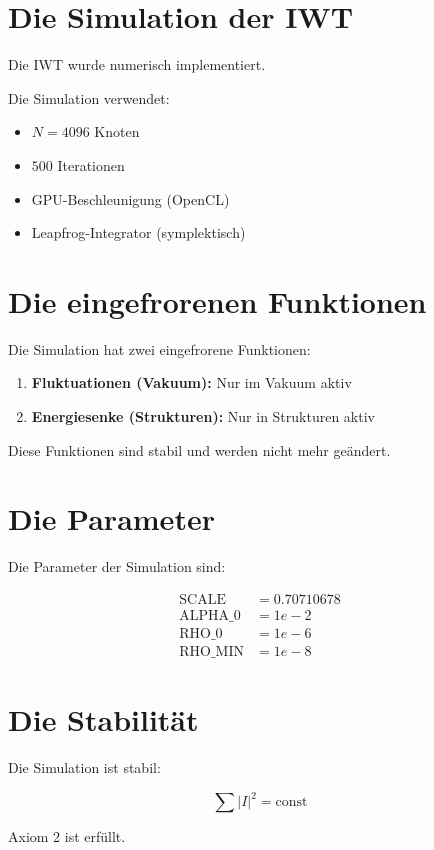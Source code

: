
\section{Die Simulation der IWT}

Die IWT wurde numerisch implementiert.

Die Simulation verwendet:

\begin{itemize}
    \item \( N = 4096 \) Knoten
    \item \( 500 \) Iterationen
    \item GPU-Beschleunigung (OpenCL)
    \item Leapfrog-Integrator (symplektisch)
\end{itemize}

\section{Die eingefrorenen Funktionen}

Die Simulation hat zwei eingefrorene Funktionen:

\begin{enumerate}
    \item \textbf{Fluktuationen (Vakuum):} Nur im Vakuum aktiv
    \item \textbf{Energiesenke (Strukturen):} Nur in Strukturen aktiv
\end{enumerate}

Diese Funktionen sind stabil und werden nicht mehr geändert.

\section{Die Parameter}

Die Parameter der Simulation sind:

\begin{align*}
    \text{SCALE} &= 0.70710678 \\
    \text{ALPHA\_0} &= 1e-2 \\
    \text{RHO\_0} &= 1e-6 \\
    \text{RHO\_MIN} &= 1e-8
\end{align*}

\section{Die Stabilität}

Die Simulation ist stabil:

\[
\sum |I|^2 = \text{const}
\]

Axiom 2 ist erfüllt.